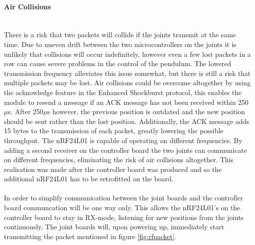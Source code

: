 \paragraph{Air Collisions}~\\ %
\label{par:air_collisions}
There is a risk that two packets will collide if the joints transmit at the same time.
Due to uneven drift between the two microcontrollers on the joints it is unlikely that collisions will occur indefinitely, however even a few lost packets in a row can cause severe problems in the control of the pendulum.
The lowered transmission frequency alleviates this issue somewhat, but there is still a risk that multiple packets may be lost.
Air collisions could be overcome altogether by using the acknowledge feature in the Enhanced Shockburst protocol, this enables the module to resend a message if an ACK message has not been received within 250$\mu$s.
After 250$\mu$s however, the previous position is outdated and the new position should be sent rather than the lost position.
Additionally, the ACK message adds 15 bytes to the transmission of each packet, greatly lowering the possible throughput.
The nRF24L01 is capable of operating on different frequencies.
By adding a second receiver on the controller board the two joints can communicate on different frequencies, eliminating the risk of air collisions altogether.
This realisation was made after the controller board was produced and so the additional nRF24L01 has to be retrofitted on the board. 
\\~\\
In order to simplify communication between the joint boards and the controller board communcation will be one way only.
This allows the nRF24L01's on the controller board to stay in RX-mode, listening for new positions from the joints continuously.
The joint boards will, upon powering up, immediately start transmitting the packet mentioned in figure \ref{fig:rfpacket}.
